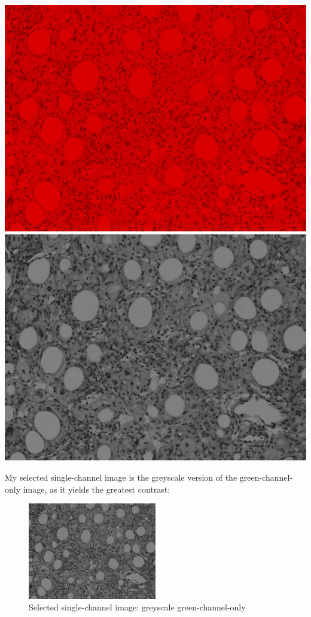 \documentclass[a4paper]{article}
\begin{document}
\begin{minipage}{0.24\textwidth}
    \centering
    \includegraphics[width=\textwidth]{../code/task1/output/r_channel.jpg}
    \includegraphics[width=\textwidth]{../code/task1/output/r_channel_greyscale.jpg}
\end{minipage}

My selected single-channel image is the greyscale version of the green-channel-only image, as it yields the greatest contrast:
\begin{figure}[H]
    \centering
    \includegraphics[width=0.5\textwidth]{../code/task1/output/g_channel_greyscale.jpg}
    \caption{Selected single-channel image: greyscale green-channel-only}
\end{figure}
\end{document}
